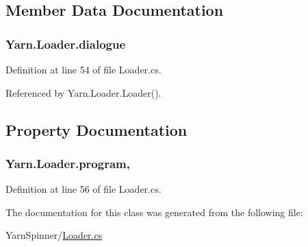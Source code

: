 \subsection{Member Data Documentation}
\hypertarget{a00125_a89d1f29eba1c52c96c62a4cfe7859a1d}{
\subsubsection[{dialogue}]{ Yarn.\-Loader.\-dialogue\hspace{0.3cm}{\ttfamily [private]}}}\label{a00125_a89d1f29eba1c52c96c62a4cfe7859a1d}


Definition at line 54 of file Loader.\-cs.



Referenced by Yarn.\-Loader.\-Loader().



\subsection{Property Documentation}
\hypertarget{a00125_a6d8296076823c0c082df9024367f4860}{
\subsubsection[{program}]{ Yarn.\-Loader.\-program\hspace{0.3cm}{\ttfamily [get]}, {\ttfamily [set]}}}\label{a00125_a6d8296076823c0c082df9024367f4860}


Definition at line 56 of file Loader.\-cs.



The documentation for this class was generated from the following file\-:\begin{DoxyCompactItemize}
\item 
Yarn\-Spinner/\hyperlink{a00288}{Loader.\-cs}\end{DoxyCompactItemize}

